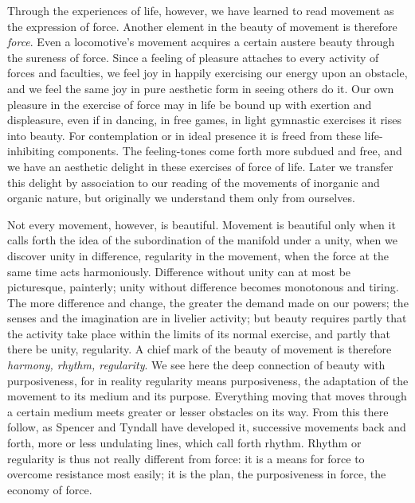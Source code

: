\documentclass[12pt,a4paper,openany]{book}
\newcommand{\opage}[1]{\marginnote{\footnotesize\textit{[#1]}}}
\begin{document}
Through the experiences of life, however, we have learned to read movement
as the expression of force. Another element in the beauty of movement
is therefore \emph{force}. Even a locomotive's
movement acquires a certain austere beauty through the sureness of force.
Since a feeling of pleasure attaches to every activity of
forces and faculties, we feel joy in happily exercising our
energy upon an obstacle, and we feel the same joy in pure
\setcounter{footnote}{0}%
\opage{268}aesthetic form in seeing others do it. Our own pleasure in
the exercise of force may in life be bound up with exertion
and displeasure, even if in dancing, in free games, in light gymnastic
exercises it rises into beauty. For contemplation or in
ideal presence it is freed from these life-inhibiting components.
The feeling-tones come forth more subdued and free,
and we have an aesthetic delight in these exercises of force of life.
Later we transfer this delight by association to our reading
of the movements of inorganic and organic nature,
but originally we understand them only from ourselves.

Not every movement, however, is beautiful. Movement
is beautiful only when it calls forth the idea of the subordination of the manifold
under a unity, when we discover unity in difference,
regularity in the movement, when the force at the same time acts
harmoniously. Difference without unity can at most be
picturesque, painterly; unity without difference becomes monotonous and
tiring. The more difference and change, the greater the demand
made on our powers; the senses and the imagination
are in livelier activity; but beauty requires
partly that the activity take place within the limits of
its normal exercise, and partly that there be unity, regularity.
A chief mark of the beauty of movement is therefore
\emph{harmony, rhythm, regularity}. We see here
the deep connection of beauty with purposiveness,
for in reality regularity means purposiveness,
the adaptation of the movement to its medium and its purpose.
Everything moving that moves through a certain medium
meets greater or lesser obstacles on its way. From this there follow,
as Spencer and Tyndall have developed it, successive
movements back and forth, more or less undulating lines,
which call forth rhythm. Rhythm or regularity
is thus not really different from force: it is a
means for force to overcome resistance most easily; it is
the plan, the purposiveness in force, the economy of force.
\end{document}
